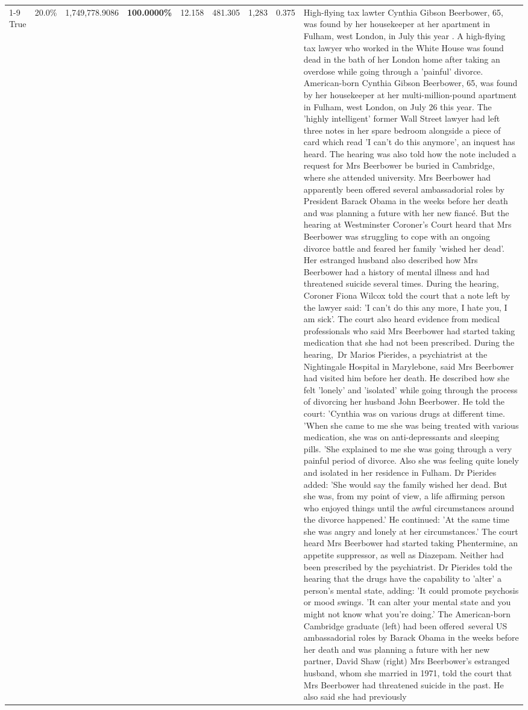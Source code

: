 \begin{table}[H]
\begin{tabular}{lllrlllll}
\cline{1-9}
True & 20.0\% & 1,749,778.9086 & \bfseries \color{red} 100.0000\% & 12.158 & 481.305 & 1,283 & 0.375 & High-flying tax lawter Cynthia Gibson Beerbower, 65, was found by her housekeeper at her apartment in Fulham, west London, in July this year . A high-flying tax lawyer who worked in the White House was found dead in the bath of her London home after taking an overdose while going through a 'painful' divorce. American-born Cynthia Gibson Beerbower, 65, was found by her housekeeper at her multi-million-pound apartment in Fulham, west London, on July 26 this year. The 'highly intelligent' former Wall Street lawyer had left three notes in her spare bedroom alongside a piece of card which read 'I can't do this anymore', an inquest has heard. The hearing was also told how the note included a request for Mrs Beerbower be buried in Cambridge, where she attended university. Mrs Beerbower had apparently been offered several ambassadorial roles by President Barack Obama in the weeks before her death and was planning a future with her new fiancé. But the hearing at Westminster Coroner's Court heard that Mrs Beerbower was struggling to cope with an ongoing divorce battle and feared her family 'wished her dead'. Her estranged husband also described how Mrs Beerbower had a history of mental illness and had threatened suicide several times. During the hearing, Coroner Fiona Wilcox told the court that a note left by the lawyer said: 'I can't do this any more, I hate you, I am sick'. The court also heard evidence from medical professionals who said Mrs Beerbower had started taking medication that she had not been prescribed. During the hearing, Dr Marios Pierides, a psychiatrist at the Nightingale Hospital in Marylebone, said Mrs Beerbower had visited him before her death. He described how she felt 'lonely' and 'isolated' while going through the process of divorcing her husband John Beerbower. He told the court: 'Cynthia was on various drugs at different time. 'When she came to me she was being treated with various medication, she was on anti-depressants and sleeping pills. 'She explained to me she was going through a very painful period of divorce. Also she was feeling quite lonely and isolated in her residence in Fulham. Dr Pierides added: 'She would say the family wished her dead. But she was, from my point of view, a life affirming person who enjoyed things until the awful circumstances around the divorce happened.' He continued: 'At the same time she was angry and lonely at her circumstances.' The court heard Mrs Beerbower had started taking Phentermine, an appetite suppressor, as well as Diazepam. Neither had been prescribed by the psychiatrist. Dr Pierides told the hearing that the drugs have the capability to 'alter' a person's mental state, adding: 'It could promote psychosis or mood swings. 'It can alter your mental state and you might not know what you're doing.' The American-born Cambridge graduate (left) had been offered several US ambassadorial roles by Barack Obama in the weeks before her death and was planning a future with her new partner, David Shaw (right) Mrs Beerbower's estranged husband, whom she married in 1971, told the court that Mrs Beerbower had threatened suicide in the past. He also said she had previously 
\end{tabular}
\end{table}
